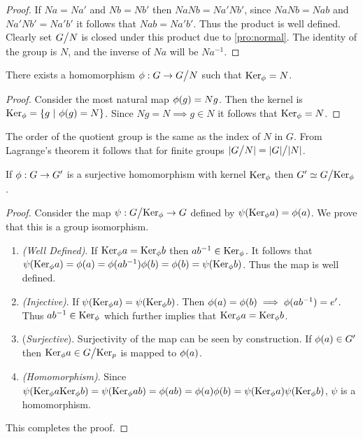 \begin{proof}
  If $Na = Na'$ and $Nb=Nb'$ then $NaNb = Na'Nb'$, since $NaNb = Nab$ and $Na'Nb' = Na'b'$ it follows that $Nab = Na'b'$. Thus the product is well defined. Clearly set $G\bign/N$ is closed under this product due to \cref{pro:normal}. The identity of the group is $N$, and the inverse of $Na$ will be $Na^{-1}$.
\end{proof}
\begin{proposition}
  There exists a homomorphism $\p: G \to G\bign/N$ such that $\text{Ker}_\phi = N$.
\end{proposition}
\begin{proof}
  Consider the most natural map $\phi(g) = Ng$. Then the kernel is $\text{Ker}_\phi = \{g\ |\ \phi(g) = N\}$. Since $Ng = N \implies g \in N$ it follows that $\text{Ker}_\phi = N$.
\end{proof}
\begin{remark}
  The order of the quotient group is the same as the index of $N$ in $G$. From Lagrange's theorem it follows that for finite groups $|G\bign/N| = |G|\bign/ |N|$.
\end{remark}
\begin{theorem}\label{thm:1iso}
  If $\phi:G\to G'$ is a surjective homomorphism with kernel $\text{Ker}_\phi$ then $G' \simeq G\bign/ \Ker_\p$.
\end{theorem}
\begin{proof}
  Consider the map $\psi: G\bign/ \Ker_\p \to G$ defined by $\psi(\text{Ker}_\phi a) = \phi(a)$. We prove that this is a group isomorphism.
  \begin{enumerate}
    \item \textit{(Well Defined)}. If $\text{Ker}_\phi a = \text{Ker}_\phi b$ then $ab^{-1} \in \text{Ker}_\phi$. It follows that $\psi(\text{Ker}_\phi a) = \phi(a) = \phi(ab^{-1})\phi(b) = \phi(b) = \psi(\text{Ker}_\phi b)$. Thus the map is well defined.
    \item \textit{(Injective)}. If $\psi(\text{Ker}_\phi a) = \psi(\text{Ker}_\phi b)$. Then $\phi(a) = \phi(b) \implies \phi(ab^{-1}) = e'$. Thus $ab^{-1} \in \text{Ker}_\phi$ which further implies that $\text{Ker}_\phi a = \text{Ker}_\phi b$.
    \item (\textit{Surjective}). Surjectivity of the map can be seen by construction. If $\phi(a)\in G'$ then $\Ker_\p a \in G\bign/ \Ker_p$ is mapped to $\phi(a)$. 
    \item \textit{(Homomorphism)}. Since $\psi(\text{Ker}_\phi a \text{Ker}_\phi b) = \psi(\text{Ker}_\phi ab) = \phi(ab) = \phi(a)\phi(b) = \psi(\text{Ker}_\phi a)\psi(\text{Ker}_\phi b)$, $\psi$ is a homomorphism.
  \end{enumerate}
  This completes the proof.
\end{proof}
